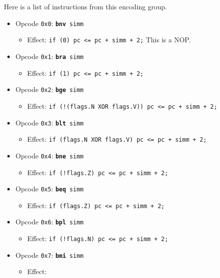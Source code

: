 \documentclass{article}
\begin{document}
	Here is a list of instructions from this encoding group.

	\singlespacing
	\begin{itemize}
		\item Opcode \texttt{0x0}:
			\texttt{\textbf{bnv} simm}
		\begin{itemize}
			\item Effect:
				\texttt{if (0) pc <= pc + simm + 2;} This is a NOP.
		\end{itemize}
		\item Opcode \texttt{0x1}:
			\texttt{\textbf{bra} simm}
		\begin{itemize}
			\item Effect:
				\texttt{if (1) pc <= pc + simm + 2;}
		\end{itemize}
		\item Opcode \texttt{0x2}:
			\texttt{\textbf{bge} simm}
		\begin{itemize}
			\item Effect:
				\texttt{if (!(flags.N XOR flags.V)) pc <= pc + simm + 2;}
		\end{itemize}
		\item Opcode \texttt{0x3}:
			\texttt{\textbf{blt} simm}
		\begin{itemize}
			\item Effect:
				\texttt{if (flags.N XOR flags.V) pc <= pc + simm + 2;}
		\end{itemize}
		\item Opcode \texttt{0x4}:
			\texttt{\textbf{bne} simm}
		\begin{itemize}
			\item Effect:
				\texttt{if (!flags.Z) pc <= pc + simm + 2;}
		\end{itemize}
		\item Opcode \texttt{0x5}:
			\texttt{\textbf{beq} simm}
		\begin{itemize}
			\item Effect:
				\texttt{if (flags.Z) pc <= pc + simm + 2;}
		\end{itemize}
		\item Opcode \texttt{0x6}:
			\texttt{\textbf{bpl} simm}
		\begin{itemize}
			\item Effect:
				\texttt{if (!flags.N) pc <= pc + simm + 2;}
		\end{itemize}
		\item Opcode \texttt{0x7}:
			\texttt{\textbf{bmi} simm}
		\begin{itemize}
			\item Effect:

\end{itemize}
\end{itemize}
\end{document}
